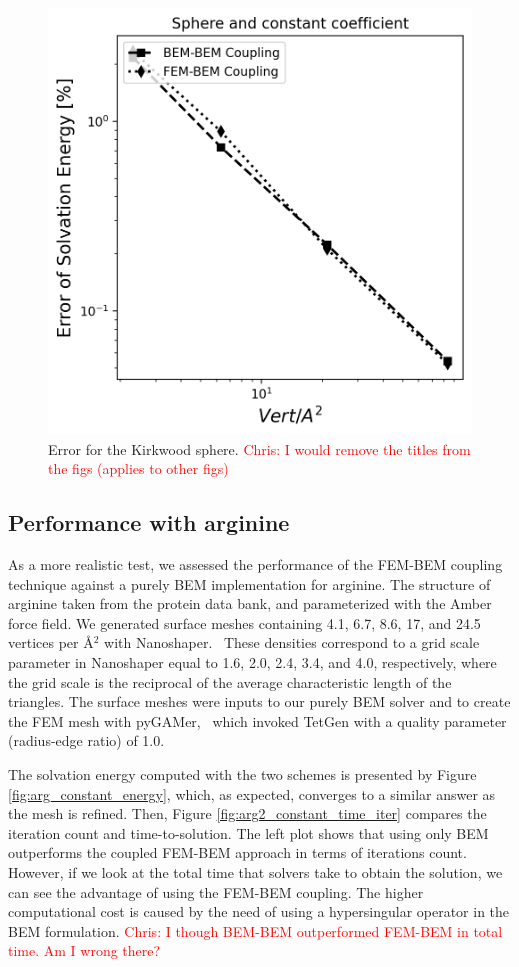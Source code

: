 \begin{figure}
  \centering
  \includegraphics[width=0.6\linewidth]{DolfinX_Sphere_const_coeff_error.png}
  \caption{Error for the Kirkwood sphere. \textcolor{red}{Chris: I would remove the titles from the figs (applies to other figs)}}
  \label{fig:error_sphere}
\end{figure}

\subsection*{\sffamily \large Performance with arginine}

As a more realistic test, we assessed the performance of the FEM-BEM coupling technique against a purely BEM implementation for arginine.
The structure of arginine taken from the protein data bank, and parameterized with the Amber\cite{ponder2003force} force field. 
We generated surface meshes containing 4.1, 6.7, 8.6, 17, and 24.5 vertices per \AA$^2$ with Nanoshaper.~\cite{decherchi2013general}
These densities correspond to a grid scale parameter in Nanoshaper equal to 1.6, 2.0, 2.4, 3.4, and 4.0, respectively, where the grid scale is the reciprocal of the average characteristic length of the triangles.
The surface meshes were inputs to our purely BEM solver and to create the FEM mesh with pyGAMer,~\cite{lee2020open} which invoked TetGen\cite{hang2015tetgen} with a quality parameter (radius-edge ratio) of 1.0.

The solvation energy computed with the two schemes is presented by Figure \ref{fig:arg_constant_energy}, which, as expected, converges to a similar answer as the mesh is refined.
Then, Figure \ref{fig:arg2_constant_time_iter} compares the iteration count and time-to-solution. The left plot shows that using only BEM outperforms the coupled FEM-BEM approach in terms of iterations count. However, if we look at the total time that solvers take to obtain the solution, we can see the advantage of using the FEM-BEM coupling. The higher computational cost is caused by the need of using a hypersingular operator in the BEM formulation. \textcolor{red}{Chris: I though BEM-BEM outperformed FEM-BEM in total time. Am I wrong there?}



